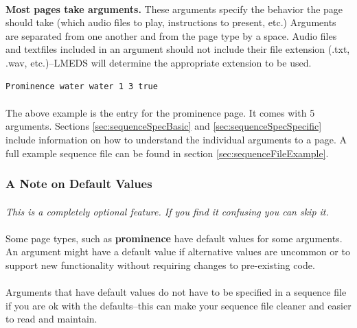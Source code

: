 \documentclass[12pt, oneside]{scrbook}   	%
\begin{document}
\paragraph{}
\textbf{Most pages take arguments.}  These arguments specify the behavior the page should take (which audio files to play, instructions to present, etc.)  Arguments are separated from one another and from the page type by a space.  Audio files and textfiles included in an argument should not include their file extension (.txt, .wav, etc.)--LMEDS will determine the appropriate extension to be used.

\begin{lstlisting}
Prominence water water 1 3 true
\end{lstlisting}

\paragraph{}
The above example is the entry for the prominence page.  It comes with 5 arguments.  Sections \ref{sec:sequenceSpecBasic} and \ref{sec:sequenceSpecSpecific} include information on how to understand the individual arguments to a page.  A full example sequence file can be found in section \ref{sec:sequenceFileExample}.


\subsubsection{A Note on Default Values}

\paragraph{}
\textit{This is a completely optional feature.  If you find it confusing you can skip it.}

\paragraph{}
Some page types, such as \textbf{prominence} have default values for some arguments.   An argument might have a default value if alternative values are uncommon or to support new functionality without requiring changes to pre-existing code.

\paragraph{}
Arguments that have default values do not have to be specified in a sequence file if you are ok with the defaults--this can make your sequence file cleaner and easier to read and maintain.
\end{document}
